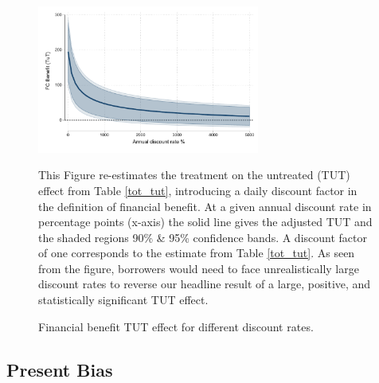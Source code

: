 \begin{appendix}
\begin{figure}[!h]
  \caption{Financial benefit TUT effect for different discount rates.}
    \begin{center}
        \centering
        \includegraphics[width=0.65\textwidth]{Figuras/discount_effect_tut.pdf}
    \end{center}
       \footnotesize{This Figure re-estimates the treatment on the untreated (TUT) effect from Table \ref{tot_tut}, introducing a daily discount factor in the definition of financial benefit.  At a given annual discount rate in percentage points (x-axis) the solid line gives the adjusted TUT and the shaded regions 90\% \& 95\% confidence bands. A discount factor of one corresponds to the estimate from Table \ref{tot_tut}. As seen from the figure, borrowers would need to face unrealistically large discount rates to reverse our headline result of a large, positive, and statistically significant TUT effect.}
        \label{fc_discount_rates}
\end{figure}

\normalsize
\normalsize



\subsection{Present Bias}\label{App_presentbias}


\end{appendix}
